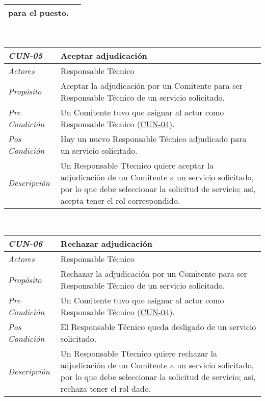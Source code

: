 \begin{center}
{\begin{tabular}{ | p{3cm} | p{12.5cm} | }
	para el puesto. \\
	\hline
\end{tabular}} \\[1cm]
\hypertarget{CUN-05}{%
\begin{tabular}{ | p{3cm} | p{12.5cm} | }
	\hline
	\rowcolor{lightgray}
	\hfil \textbf{\textit{CUN-05}} &
	\hfil \textbf{Aceptar adjudicaci\'on} \\
	\hline
	\raggedleft \textit{Actores} & Responsable T\'ecnico \\
	\hline
	\raggedleft \textit{Prop\'osito} & Aceptar la
	adjudicaci\'on por un Comitente para ser Responsable
	T\'ecnico de un servicio solicitado. \\
	\hline
	\raggedleft \textit{Pre Condici\'on} & Un Comitente
	tuvo que asignar al actor como Responsable T\'ecnico
	(\hyperlink{CUN-04}{CUN-04}). \\
	\hline
	\raggedleft \textit{Pos Condici\'on} & Hay un nuevo
	Responsable T\'ecnico adjudicado para un servicio
	solicitado. \\
	\hline
	\raggedleft \textit{Descripci\'on} &
	Un Responsable T\'tecnico quiere aceptar la adjudicaci\'on
	de un Comitente a un servicio solicitado, por lo que debe
	seleccionar la solicitud de servicio; as\'i, acepta tener
	el rol correspondido. \\
	\hline
\end{tabular}} \\[1cm]
\hypertarget{CUN-06}{%
\begin{tabular}{ | p{3cm} | p{12.5cm} | }
	\hline
	\rowcolor{lightgray}
	\hfil \textbf{\textit{CUN-06}} &
	\hfil \textbf{Rechazar adjudicaci\'on} \\
	\hline
	\raggedleft \textit{Actores} & Responsable T\'ecnico \\
	\hline
	\raggedleft \textit{Prop\'osito} & Rechazar la
	adjudicaci\'on por un Comitente para ser Responsable
	T\'ecnico de un servicio solicitado. \\
	\hline
	\raggedleft \textit{Pre Condici\'on} & Un Comitente
	tuvo que asignar al actor como Responsable T\'ecnico
	(\hyperlink{CUN-04}{CUN-04}). \\
	\hline
	\raggedleft \textit{Pos Condici\'on} & El Responsable
	T\'ecnico queda desligado de un servicio solicitado. \\
	\hline
	\raggedleft \textit{Descripci\'on} &
	Un Responsable T\'tecnico quiere rechazar la adjudicaci\'on
	de un Comitente a un servicio solicitado, por lo que debe
	seleccionar la solicitud de servicio; as\'i, rechaza tener
	el rol dado. \\

\end{tabular}}
\end{center}
